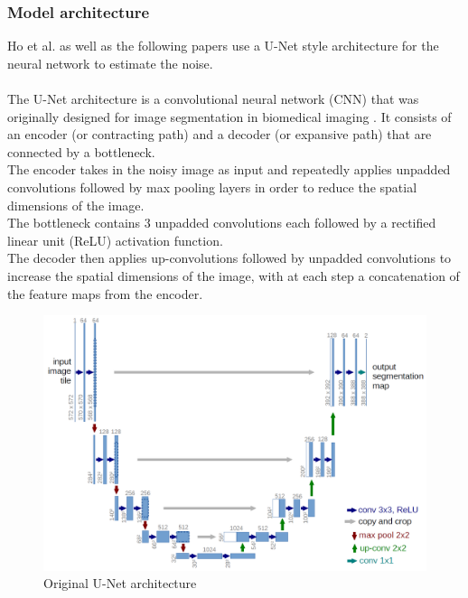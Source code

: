 \documentclass[twoside]{article}
\numberwithin{equation}{section}
\numberwithin{figure}{section}
\begin{document}
\subsubsection{Model architecture}
\label{subsubsec:model_architecture}
Ho et al. \cite{ho2020denoising} as well as the following papers \cite{song2022denoising, nichol2021improved, dhariwal2021diffusion} use a U-Net style architecture for the neural network to estimate the noise. 
\\\\
The U-Net architecture is a convolutional neural network (CNN) that was originally designed for image segmentation in biomedical imaging \cite{ronneberger2015unet}. It consists of an encoder (or contracting path) and a decoder (or expansive path) that are connected by a bottleneck. \\
The encoder takes in the noisy image as input and repeatedly applies unpadded convolutions followed by max pooling layers in order to reduce the spatial dimensions of the image. \cite{ronneberger2015unet} \\
The bottleneck contains 3 unpadded convolutions each followed by a rectified linear unit (ReLU) activation function. \cite{ronneberger2015unet} \\
The decoder then applies up-convolutions followed by unpadded convolutions to increase the spatial dimensions of the image, with at each step a concatenation of the feature maps from the encoder. \cite{ronneberger2015unet}
\begin{figure}[h]
  \includegraphics[width=\textwidth]{images/unet.png}
  \caption{Original U-Net architecture \cite{ronneberger2015unet}}
\end{figure}
\\\\
\end{document}
